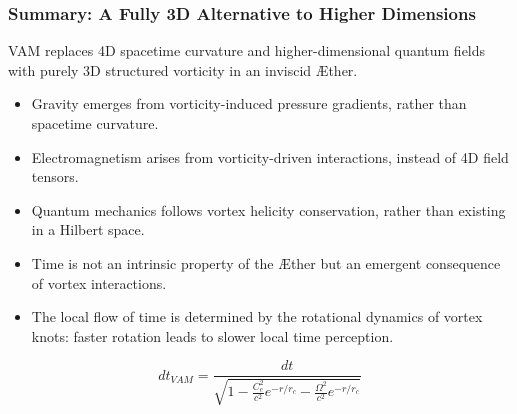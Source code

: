     \begin{table}[h]
        \centering
        \caption{Comparison between Standard Quantum Mechanics and VAM}
        \label{tab:QM_vs_VAM}
    \end{table}

    \subsubsection*{Summary: A Fully 3D Alternative to Higher Dimensions}

    VAM replaces 4D spacetime curvature and higher-dimensional quantum fields with purely 3D structured vorticity in an inviscid Æther.

    \begin{itemize}
        \item Gravity emerges from vorticity-induced pressure gradients, rather than spacetime curvature.
        \item Electromagnetism arises from vorticity-driven interactions, instead of 4D field tensors.
        \item Quantum mechanics follows vortex helicity conservation, rather than existing in a Hilbert space.
    \item Time is not an intrinsic property of the Æther but an emergent consequence of vortex interactions.
    \item The local flow of time is determined by the rotational dynamics of vortex knots: faster rotation leads to slower local time perception.
\end{itemize}

\begin{equation*}
    dt_{VAM} = \frac{dt}{\sqrt{1 - \frac{C_e^2}{c^2} e^{-r/r_c} - \frac{\Omega^2}{c^2} e^{-r/r_c}}}
\end{equation*}

